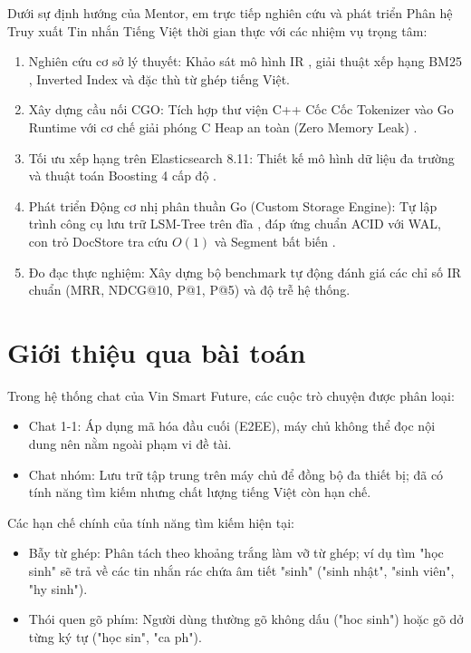 \documentclass[12pt,a4paper,oneside]{report}
\begin{document}
Dưới sự định hướng của Mentor, em trực tiếp nghiên cứu và phát triển Phân hệ Truy xuất Tin nhắn Tiếng Việt thời gian thực với các nhiệm vụ trọng tâm:
\begin{enumerate}
    \item Nghiên cứu cơ sở lý thuyết: Khảo sát mô hình IR \cite{ref9}, giải thuật xếp hạng BM25 \cite{ref2}, Inverted Index \cite{ref1} và đặc thù từ ghép tiếng Việt.
    \item Xây dựng cầu nối CGO: Tích hợp thư viện C++ Cốc Cốc Tokenizer \cite{ref5} vào Go Runtime với cơ chế giải phóng C Heap an toàn (Zero Memory Leak) \cite{ref6}.
    \item Tối ưu xếp hạng trên Elasticsearch 8.11: Thiết kế mô hình dữ liệu đa trường và thuật toán Boosting 4 cấp độ \cite{ref4}.
    \item Phát triển Động cơ nhị phân thuần Go (Custom Storage Engine): Tự lập trình công cụ lưu trữ LSM-Tree trên đĩa \cite{ref3}, đáp ứng chuẩn ACID với WAL, con trỏ DocStore tra cứu $O(1)$ và Segment bất biến \cite{ref8}.
    \item Đo đạc thực nghiệm: Xây dựng bộ benchmark tự động đánh giá các chỉ số IR chuẩn (MRR, NDCG@10, P@1, P@5) \cite{ref1} và độ trễ hệ thống.
\end{enumerate}

\section{Giới thiệu qua bài toán}
Trong hệ thống chat của Vin Smart Future, các cuộc trò chuyện được phân loại:
\begin{itemize}
    \item Chat 1-1: Áp dụng mã hóa đầu cuối (E2EE), máy chủ không thể đọc nội dung nên nằm ngoài phạm vi đề tài.
    \item Chat nhóm: Lưu trữ tập trung trên máy chủ để đồng bộ đa thiết bị; đã có tính năng tìm kiếm nhưng chất lượng tiếng Việt còn hạn chế.
\end{itemize}

Các hạn chế chính của tính năng tìm kiếm hiện tại:
\begin{itemize}
    \item Bẫy từ ghép: Phân tách theo khoảng trắng làm vỡ từ ghép; ví dụ tìm "học sinh" sẽ trả về các tin nhắn rác chứa âm tiết "sinh" ("sinh nhật", "sinh viên", "hy sinh").
    \item Thói quen gõ phím: Người dùng thường gõ không dấu ("hoc sinh") hoặc gõ dở từng ký tự ("học sin", "ca ph").
\end{itemize}
\end{document}
